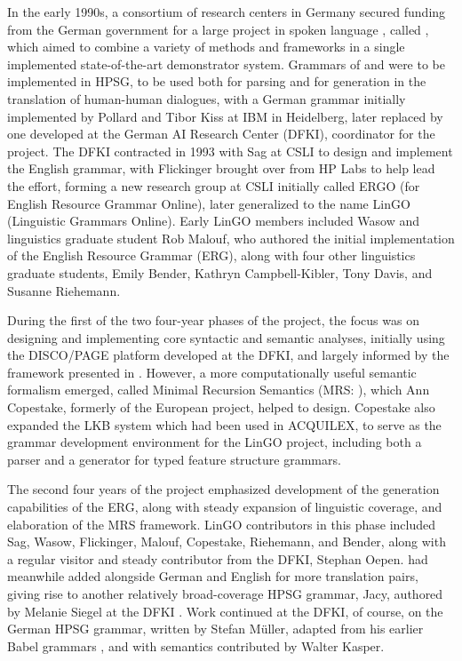 \documentclass[output=paper]{langsci/langscibook}
\begin{document}
In the early 1990s, a consortium of research centers in Germany secured funding from the German government for a large project in spoken language , called \verbmobil \citep{Wahlster2000a-ed}, which aimed to combine a variety of methods and frameworks in a single implemented state-of-the-art demonstrator system.  Grammars of  and  were to be implemented in HPSG, to be used both for parsing and for generation in the translation of human-human dialogues, with a German grammar initially implemented by Pollard and Tibor Kiss at IBM in Heidelberg, later replaced by one developed at the German AI Research Center (DFKI), coordinator for the \verbmobil project.  The DFKI contracted in 1993 with Sag at CSLI to design and implement the English grammar, with Flickinger brought over from HP Labs to help lead the effort, forming a new research group at CSLI initially called ERGO (for English Resource Grammar Online), later generalized to the name LinGO (Linguistic Grammars Online).  Early LinGO members included Wasow and linguistics graduate student Rob Malouf, who authored the initial implementation of the English Resource Grammar (ERG), along with four other linguistics graduate students, Emily Bender, Kathryn Campbell-Kibler, Tony Davis, and Susanne Riehemann.

During the first of the two four-year phases of the \verbmobil project, the focus was on designing and implementing core syntactic and semantic analyses, initially using the DISCO/PAGE platform \citep{DISCO94} developed at the DFKI, and largely informed by the framework presented in \citet{ps2}.  However, a more computationally useful semantic formalism emerged, called Minimal Recursion Semantics (MRS: \citet*{CFPS2005a}), which Ann Copestake, formerly of the European  project, helped to design.  Copestake also expanded the LKB system \citep{Copestake2002a-Short} which had been used in ACQUILEX, to serve as the grammar development environment for the LinGO project, including both a parser and a generator for typed feature structure grammars.

The second four years of the \verbmobil project emphasized development of the generation capabilities of the ERG, along with steady expansion of linguistic coverage, and elaboration of the MRS framework.  LinGO contributors in this phase included Sag, Wasow, Flickinger, Malouf, Copestake, Riehemann, and Bender, along with a regular visitor and steady contributor from the DFKI, Stephan Oepen.  \verbmobil had meanwhile added  alongside German \citep{MK2000a} and English \citep*{FCS2000a} for more translation pairs, giving rise to another relatively broad-coverage HPSG grammar, Jacy, authored by Melanie Siegel at the DFKI \citep{Siegel2000a}.  Work continued at the DFKI, of course, on the German HPSG grammar, written by Stefan M{\"u}ller, adapted from his earlier Babel grammars \citep{Mueller99a}, and with semantics contributed by Walter Kasper.
\end{document}
